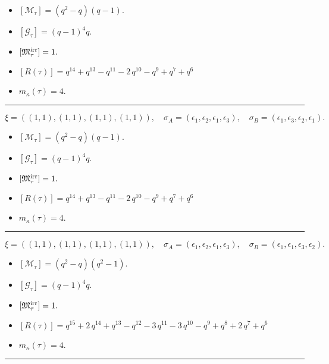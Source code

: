 \documentclass[10pt,a4paper]{amsart}
\begin{document}
\begin{itemize}
 \item $[\mathcal{M}_{\tau}] = {\left(q^{2} - q\right)} {\left(q - 1\right)} .$

 \item $[\mathcal{G}_{\tau}] = {\left(q - 1\right)}^{4} q .$

 \item $[{\frak M}_{\tau}^{\textrm{irr}}] = 1 .$

 \item $[R(\tau)] = q^{14} + q^{13} - q^{11} - 2 \, q^{10} - q^{9} + q^{7} + q^{6} $

 \item $m_{\kappa}(\tau) = 4 .$

 \end{itemize}
\noindent\rule{8cm}{0.4pt}

$$\xi = ({(1, 1), (1, 1)}, {(1, 1), (1, 1)}),\quad \sigma_A = ({{\epsilon_1}, {\epsilon_2}}, {{\epsilon_1}, {\epsilon_3}}),\quad \sigma_B = ({{\epsilon_1}, {\epsilon_3}}, {{\epsilon_2}, {\epsilon_1}}).$$

\begin{itemize}
 \item $[\mathcal{M}_{\tau}] = {\left(q^{2} - q\right)} {\left(q - 1\right)} .$

 \item $[\mathcal{G}_{\tau}] = {\left(q - 1\right)}^{4} q .$

 \item $[{\frak M}_{\tau}^{\textrm{irr}}] = 1 .$

 \item $[R(\tau)] = q^{14} + q^{13} - q^{11} - 2 \, q^{10} - q^{9} + q^{7} + q^{6} $

 \item $m_{\kappa}(\tau) = 4 .$

 \end{itemize}
\noindent\rule{8cm}{0.4pt}

$$\xi = ({(1, 1), (1, 1)}, {(1, 1), (1, 1)}),\quad \sigma_A = ({{\epsilon_1}, {\epsilon_2}}, {{\epsilon_1}, {\epsilon_3}}),\quad \sigma_B = ({{\epsilon_1}, {\epsilon_1}}, {{\epsilon_3}, {\epsilon_2}}).$$

\begin{itemize}
 \item $[\mathcal{M}_{\tau}] = {\left(q^{2} - q\right)} {\left(q^{2} - 1\right)} .$

 \item $[\mathcal{G}_{\tau}] = {\left(q - 1\right)}^{4} q .$

 \item $[{\frak M}_{\tau}^{\textrm{irr}}] = 1 .$

 \item $[R(\tau)] = q^{15} + 2 \, q^{14} + q^{13} - q^{12} - 3 \, q^{11} - 3 \, q^{10} - q^{9} + q^{8} + 2 \, q^{7} + q^{6} $

 \item $m_{\kappa}(\tau) = 4 .$

 \end{itemize}
\noindent\rule{8cm}{0.4pt}
\end{document}
